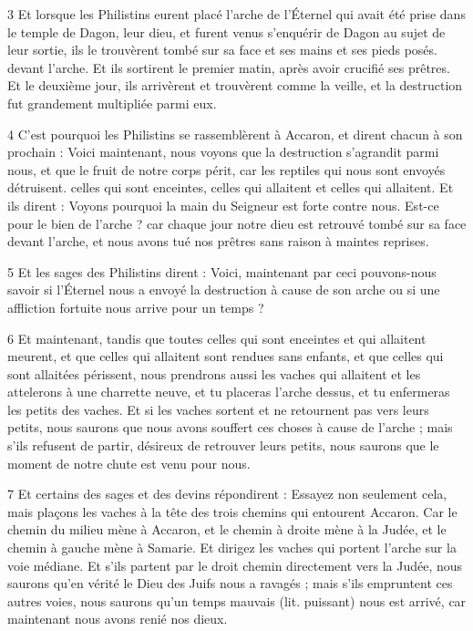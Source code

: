\par 3 Et lorsque les Philistins eurent placé l'arche de l'Éternel qui avait été prise dans le temple de Dagon, leur dieu, et furent venus s'enquérir de Dagon au sujet de leur sortie, ils le trouvèrent tombé sur sa face et ses mains et ses pieds posés. devant l'arche. Et ils sortirent le premier matin, après avoir crucifié ses prêtres. Et le deuxième jour, ils arrivèrent et trouvèrent comme la veille, et la destruction fut grandement multipliée parmi eux.

\par 4 C'est pourquoi les Philistins se rassemblèrent à Accaron, et dirent chacun à son prochain : Voici maintenant, nous voyons que la destruction s'agrandit parmi nous, et que le fruit de notre corps périt, car les reptiles qui nous sont envoyés détruisent. celles qui sont enceintes, celles qui allaitent et celles qui allaitent. Et ils dirent : Voyons pourquoi la main du Seigneur est forte contre nous. Est-ce pour le bien de l'arche ? car chaque jour notre dieu est retrouvé tombé sur sa face devant l'arche, et nous avons tué nos prêtres sans raison à maintes reprises.

\par 5 Et les sages des Philistins dirent : Voici, maintenant par ceci pouvons-nous savoir si l'Éternel nous a envoyé la destruction à cause de son arche ou si une affliction fortuite nous arrive pour un temps ?

\par 6 Et maintenant, tandis que toutes celles qui sont enceintes et qui allaitent meurent, et que celles qui allaitent sont rendues sans enfants, et que celles qui sont allaitées périssent, nous prendrons aussi les vaches qui allaitent et les attelerons à une charrette neuve, et tu placeras l'arche dessus, et tu enfermeras les petits des vaches. Et si les vaches sortent et ne retournent pas vers leurs petits, nous saurons que nous avons souffert ces choses à cause de l'arche ; mais s'ils refusent de partir, désireux de retrouver leurs petits, nous saurons que le moment de notre chute est venu pour nous.

\par 7 Et certains des sages et des devins répondirent : Essayez non seulement cela, mais plaçons les vaches à la tête des trois chemins qui entourent Accaron. Car le chemin du milieu mène à Accaron, et le chemin à droite mène à la Judée, et le chemin à gauche mène à Samarie. Et dirigez les vaches qui portent l’arche sur la voie médiane. Et s’ils partent par le droit chemin directement vers la Judée, nous saurons qu’en vérité le Dieu des Juifs nous a ravagés ; mais s'ils empruntent ces autres voies, nous saurons qu'un temps mauvais (lit. puissant) nous est arrivé, car maintenant nous avons renié nos dieux.

